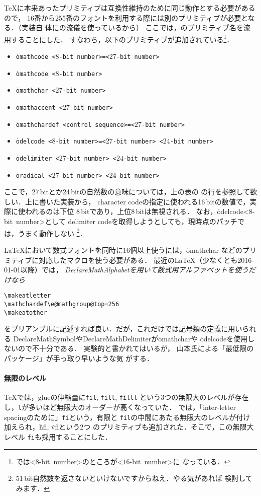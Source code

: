 \documentclass[a4paper,11pt]{jsarticle}
\begin{document}
\def\bits#1{<{$#1$}-bit\ number>}
\TeX に本来あったプリミティブは互換性維持のために同じ動作とする必要があるので，
16番から255番のフォントを利用する際には別のプリミティブが必要となる．（実装自
体に\OMEGA の流儀を使っているから）
ここでは，\OMEGA のプリミティブ名を流用することにした．
すなわち，以下のプリミティブが追加されている\footnote{\OMEGA では\bits{8}のところが\bits{16}に
なっている．}．
\begin{itemize}
\item \texttt{\.{omathcode} \bits{8}=\bits{27}}
\item \texttt{\.{omathcode} \bits{8}}
\item \texttt{\.{omathchar} \bits{27}}
\item \texttt{\.{omathaccent} \bits{27}}
\item \texttt{\.{omathchardef} <control sequence>=\bits{27}}
\item \texttt{\.{odelcode} \bits{8}=\bits{27}\ \bits{24}}
\item \texttt{\.{odelimiter} \bits{27}\ \bits{24}}
\item \texttt{\.{oradical} \bits{27}\ \bits{24}}
\end{itemize}
ここで，27\,bitとか24\,bitの自然数の意味については，上の表の
\OMEGA の行を参照して欲しい．上に書いた実装から，
character codeの指定に使われる16\,bitの数値で，実際に使われるのは下位
8\,bitであり，上位8\,bitは無視される．
なお，\.{odelcode}\bits 8として
delimiter codeを取得しようとしても，現時点のパッチでは，うまく動作しない
\footnote{51\,bit自然数を返さないといけないですからねえ．やる気があれば
検討してみます．}．

\medskip
\LaTeX において数式フォントを同時に16個以上使うには，\.{omathchar}%
などのプリミティブに対応したマクロを使う必要がある．
最近の\LaTeX（少なくとも2016-01-01以降）では，
\emph{\.{DeclareMathAlphabet}を用いて数式用アルファベットを使うだけなら}
\begin{verbatim}
\makeatletter
\mathchardef\e@mathgroup@top=256
\makeatother
\end{verbatim}
をプリアンブルに記述すれば良い．だが，これだけでは記号類の定義に用いられる
\.{DeclareMathSymbol}や\.{DeclareMathDelimiter}が\.{omathchar}や
\.{odelcode}を使用しないので不十分である．
実験的と書かれてはいるが，
山本氏による「最低限のパッケージ」\cite{yamamoto3}が手っ取り早いような気
がする．

\paragraph{無限のレベル}
\TeX では，glueの伸縮量に\texttt{fil}, \texttt{fill}, \texttt{filll}
という3つの無限大のレベルが存在し，\texttt{l}が多いほど無限大のオーダーが高くなっていた．
\OMEGA では，「inter-letter spacingのために」\texttt{fi}という，有限と
\texttt{fil}の中間にあたる無限大のレベルが付け加えられ，\.{hfi}, \.{vfi}という2つ
のプリミティブも追加された．そこで，この無限大レベル
\texttt{fi}も採用することにした．
\end{document}
